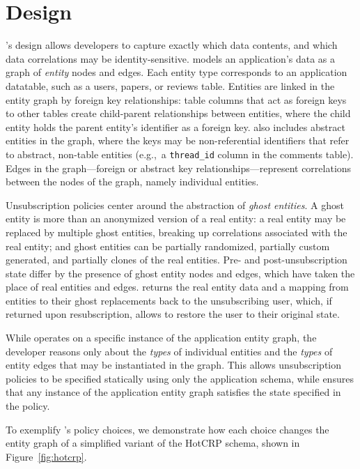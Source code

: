 \section{Design}
\sys's design allows developers to capture exactly which data contents, and which data correlations may be
identity-sensitive. \sys models an application's data as a graph of \emph{entity} nodes and edges.
Each entity type corresponds to an application datatable, such as a users, papers, or reviews table.
Entities are linked in the entity graph by foreign key relationships: table columns that act as
foreign keys to other tables create child-parent relationships between entities, where the child
entity holds the parent entity's identifier as a foreign key. \sys also includes
abstract entities in the graph, where the keys may be non-referential identifiers that refer to
abstract, non-table entities (e.g.,\ a \texttt{thread\_id} column in the comments table).  Edges in
the graph---foreign or abstract key relationships---represent correlations between the nodes of the
graph, namely individual entities.

Unsubscription policies center around the abstraction of \emph{ghost entities}. A ghost entity is
more than an anonymized version of a real entity: a real entity may be replaced by multiple ghost
entities, breaking up correlations associated with the real entity; and ghost entities can be
partially randomized, partially custom generated, and partially clones of the real entities. 
Pre- and post-unsubscription state differ by the presence of ghost entity nodes and edges, which
have taken the place of real entities and edges. \sys returns the real entity data and a mapping
from entities to their ghost replacements back to the unsubscribing user, which, if returned upon
resubscription, allows \sys to restore the user to their original state.

While \sys operates on a specific instance of the application entity graph, the developer reasons
only about the \emph{types} of individual entities and the \emph{types} of entity edges that may be
instantiated in the graph. This allows unsubscription policies to be specified statically using only
the application schema, while \sys ensures that any instance of the application entity graph
satisfies the state specified in the policy.

To exemplify \sys's policy choices, we demonstrate how each choice changes the entity graph of a
simplified variant of the HotCRP schema, shown in Figure~\ref{fig:hotcrp}.

